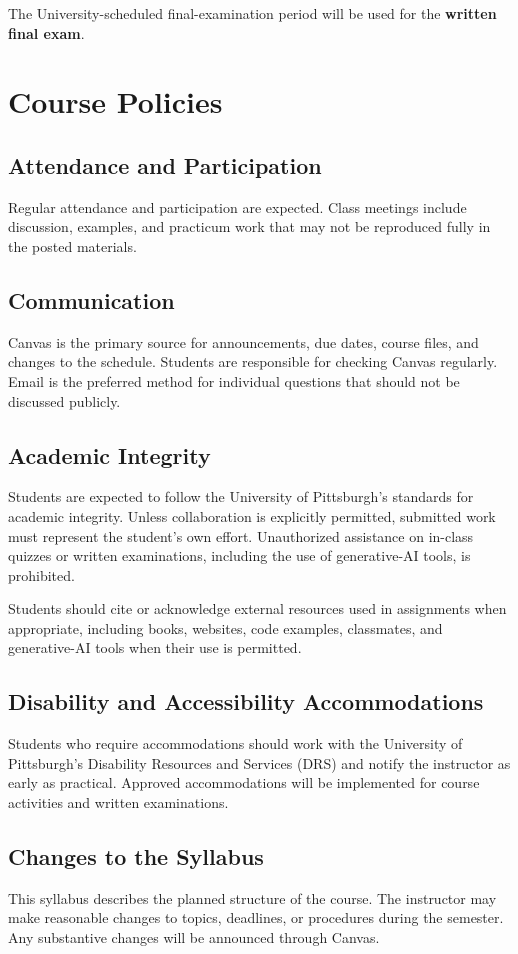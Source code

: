 \documentclass[11pt]{article}
\begin{document}
The University-scheduled final-examination period will be used for the \textbf{written final exam}.

\section{Course Policies}

\subsection{Attendance and Participation}

Regular attendance and participation are expected. Class meetings include discussion, examples, and practicum work that may not be reproduced fully in the posted materials.

\subsection{Communication}

Canvas is the primary source for announcements, due dates, course files, and changes to the schedule. Students are responsible for checking Canvas regularly. Email is the preferred method for individual questions that should not be discussed publicly.

\subsection{Academic Integrity}

Students are expected to follow the University of Pittsburgh's standards for academic integrity. Unless collaboration is explicitly permitted, submitted work must represent the student's own effort. Unauthorized assistance on in-class quizzes or written examinations, including the use of generative-AI tools, is prohibited.

Students should cite or acknowledge external resources used in assignments when appropriate, including books, websites, code examples, classmates, and generative-AI tools when their use is permitted.

\subsection{Disability and Accessibility Accommodations}

Students who require accommodations should work with the University of Pittsburgh's Disability Resources and Services (DRS) and notify the instructor as early as practical. Approved accommodations will be implemented for course activities and written examinations.

\subsection{Changes to the Syllabus}

This syllabus describes the planned structure of the course. The instructor may make reasonable changes to topics, deadlines, or procedures during the semester. Any substantive changes will be announced through Canvas.
\end{document}
